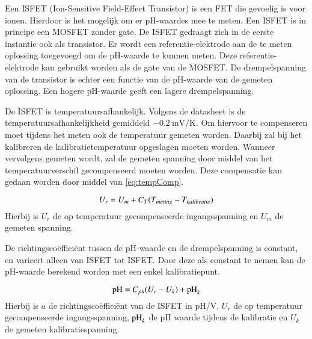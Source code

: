 Een ISFET (Ion-Sensitive Field-Effect Transistor) is een FET die gevoelig is voor ionen. Hierdoor is het mogelijk om er pH-waardes mee te meten\cite{modeling}. Een ISFET is in principe een MOSFET zonder gate. De ISFET gedraagt zich in de eerste instantie ook als transistor. Er wordt een referentie-elektrode aan de te meten oplossing toegevoegd om de pH-waarde te kunnen meten. Deze referentie-elektrode kan gebruikt worden als de gate van de MOSFET\cite{van1987isfet}. De drempelspanning van de transistor is echter een functie van de pH-waarde van de gemeten oplossing. Een hogere pH-waarde geeft een lagere drempelspanning\cite{isfet}.

De ISFET is temperatuursafhankelijk\cite{isfet}. Volgens de datasheet is de temperatuursafhankelijkheid gemiddeld $\qty{-0.2}{\milli\volt\per\kelvin}$\cite{Microsens-MSFET}. Om hiervoor te compenseren moet tijdens het meten ook de temperatuur gemeten worden. Daarbij zal bij het kalibreren de kalibratietemperatuur opgeslagen moeten worden. Wanneer vervolgens gemeten wordt, zal de gemeten spanning door middel van het temperatuurverschil gecompenseerd moeten worden. Deze compensatie kan gedaan worden door middel van \cref{eq:tempComp}.

\begin{equation}\label{eq:tempComp}
    U_r = U_m + C_T(T_{meting} - T_{kalibratie})
    \tagaddtext{[\si{\volt}]}
\end{equation}
Hierbij is $U_r$ de op temperatuur gecompenseerde ingangsspanning en $U_m$ de gemeten spanning.

De richtingscoëfficiënt tussen de pH-waarde en de drempelspanning is constant, en varieert alleen van ISFET tot ISFET. Door deze als constant te nemen kan de pH-waarde berekend worden met een enkel kalibratiepunt.

\begin{equation}\label{eq:calcPH}
    \ph = C_{ph}(U_r - U_k) + \ph_k
    \tagaddtext{[pH]}
\end{equation}
Hierbij is $a$ de richtingscoëfficiënt van de ISFET in pH/V, $U_r$ de op temperatuur gecompenseerde ingangsspanning, $\mathrm{pH}_k$ de pH waarde tijdens de kalibratie en $U_k$ de gemeten kalibratiespanning.